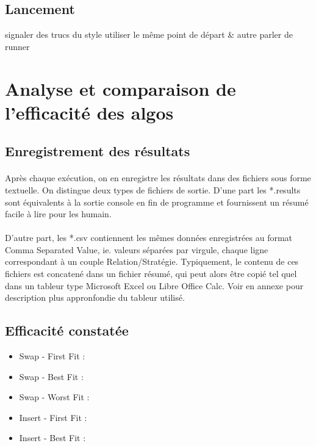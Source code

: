 \documentclass[a4paper,10pt]{report}
\begin{document}
\subsection{Lancement}
signaler des trucs du style utiliser le même point de départ \& autre
parler de runner

\section{Analyse et comparaison de l'efficacité des algos}
\subsection{Enregistrement des résultats}

\paragraph{}
  Après chaque exécution, on en enregistre les résultats dans des fichiers sous forme textuelle. On distingue deux
types de fichiers de sortie. D'une part les *.results sont équivalents à la sortie console en fin de programme et
fournissent un résumé facile à lire pour les humain.
\paragraph{}
  D'autre part, les *.csv contiennent les mêmes données enregistrées au format Comma Separated Value, ie. valeurs
séparées par virgule, chaque ligne correspondant à un couple Relation/Stratégie. Typiquement, le contenu de ces 
fichiers est concatené dans un fichier résumé, qui peut alors être copié tel quel dans un tableur type Microsoft
Excel ou Libre Office Calc. Voir en annexe pour description plus appronfondie du tableur utilisé.
  

\subsection{Efficacité constatée}
\begin{itemize}
 \item Swap - First Fit : 
 \item Swap - Best Fit : 
 \item Swap - Worst Fit : 
 \item Insert - First Fit :
 \item Insert - Best Fit :
\end{itemize}
\end{document}
